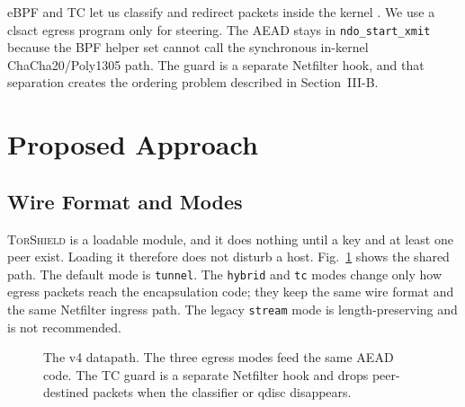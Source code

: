 \documentclass[conference]{IEEEtran}
\newcommand{\sys}{\textsc{TorShield}}
\newcommand{\code}[1]{\texttt{#1}}
\begin{document}
eBPF and TC let us classify and redirect packets inside the kernel \cite{hoiland2018xdp}. We use a clsact egress program only for steering. The AEAD stays in \code{ndo\_start\_xmit} because the BPF helper set cannot call the synchronous in-kernel ChaCha20/Poly1305 path. The guard is a separate Netfilter hook, and that separation creates the ordering problem described in Section~III-B.

\section{Proposed Approach}
\subsection{Wire Format and Modes}
\sys{} is a loadable module, and it does nothing until a key and at least one peer exist. Loading it therefore does not disturb a host. Fig.~\ref{fig:datapath} shows the shared path. The default mode is \code{tunnel}. The \code{hybrid} and \code{tc} modes change only how egress packets reach the encapsulation code; they keep the same wire format and the same Netfilter ingress path. The legacy \code{stream} mode is length-preserving and is not recommended.

\begin{figure}[t]
\centering
{}
\caption{The v4 datapath. The three egress modes feed the same AEAD code. The TC guard is a separate Netfilter hook and drops peer-destined packets when the classifier or qdisc disappears.}
\label{fig:datapath}
\end{figure}
\end{document}
